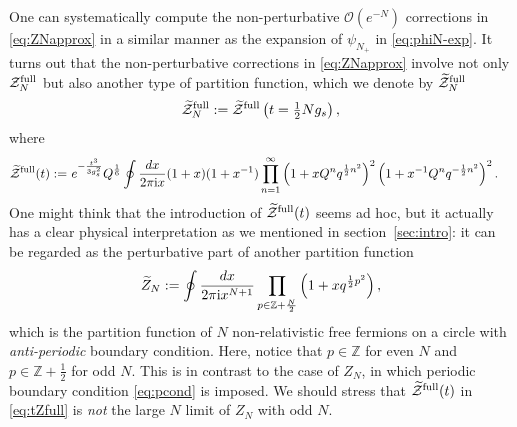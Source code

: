 \documentclass[11pt]{article}
\newcommand{\ri}{{\rm i}}
\newcommand{\hf}{\frac{1}{2}}
\renewcommand{\[}{\begin{eqnarray}}
\renewcommand{\]}{\end{eqnarray}}
\newcommand{\bbZ}{{\mathbb Z}}
\newcommand{\tZ}{{\widetilde Z}}
\newcommand{\Zefull}{{\cal Z}^{\text{full}}}
\newcommand{\Zofull}{{\widetilde{\cal Z}}^{\text{full}}}
\begin{document}
One can systematically compute 
the non-perturbative $\mathcal{O}(e^{-N})$ corrections
in \eqref{eq:ZNapprox} in a similar manner as
the expansion of $\psi_{N_+}$ in \eqref{eq:phiN-exp}.
It turns out that the non-perturbative corrections
in \eqref{eq:ZNapprox} involve not only $\Zefull_N$
but also another type of
partition function, which we denote
by $\Zofull_N$
\begin{align}
\Zofull_N:=\Zofull\left(t=\tfrac{1}{2}Ng_s\right),
\label{eq:ZofullN-def}
\end{align}
where
\begin{align}
\begin{aligned}
\Zofull(t):=&\ e^{-\frac{t^3}{3g_s^2}}Q^{\frac{1}{6}}\oint\frac{dx}{2\pi\ri x}
 (1+x)(1+x^{-1})
 \prod_{n=1}^\infty
 \left(1+xQ^n q^{\hf n^2}\right)^2
 \left(1+x^{-1}Q^n q^{-\hf n^2}\right)^2.
\end{aligned}
\label{eq:tZfull}
\end{align}
One might think that the 
introduction of $\Zofull(t)$ seems 
ad hoc, but it actually
has a 
clear physical interpretation as we mentioned in section~\ref{sec:intro}:
it can be regarded as the perturbative part of
another partition function 
%
\begin{align}
\tZ_N:=\oint\frac{dx}{2\pi\ri x^{N+1}}
 \prod_{p\in\bbZ+\frac{N}{2}}\left(1+xq^{\hf p^2}\right),
\label{eq:tZN-def}
\end{align}
%
which is the partition function of
$N$ non-relativistic free fermions on a circle
with {\it anti-periodic} boundary condition.
Here, notice that $p\in\bbZ$ for even $N$ and $p\in\bbZ+\frac{1}{2}$
for odd $N$.
This is in contrast to the case of $Z_N$,
in which periodic boundary condition \eqref{eq:pcond}
is imposed.
We should stress that $\Zofull(t)$ in \eqref{eq:tZfull}
is {\em not} the large $N$ limit of $Z_N$ with odd $N$.
\end{document}
